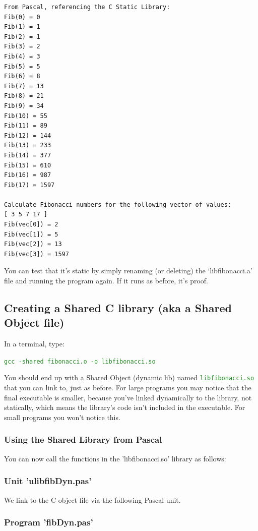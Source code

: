 \documentclass[10pt,a4paper]{article}
\newcommand{\mytext}[1]{\textcolor{ForestGreen}{\texttt{#1}}}
\begin{document}
\lstset{style=myBash}
\begin{lstlisting}
From Pascal, referencing the C Static Library:
Fib(0) = 0
Fib(1) = 1
Fib(2) = 1
Fib(3) = 2
Fib(4) = 3
Fib(5) = 5
Fib(6) = 8
Fib(7) = 13
Fib(8) = 21
Fib(9) = 34
Fib(10) = 55
Fib(11) = 89
Fib(12) = 144
Fib(13) = 233
Fib(14) = 377
Fib(15) = 610
Fib(16) = 987
Fib(17) = 1597

Calculate Fibonacci numbers for the following vector of values:
[ 3 5 7 17 ]
Fib(vec[0]) = 2
Fib(vec[1]) = 5
Fib(vec[2]) = 13
Fib(vec[3]) = 1597
\end{lstlisting}

You can test that it's static by simply renaming (or deleting) the `libfibonacci.a'
file and running the program again. If it runs as before, it's proof.
\clearpage

\subsection{Creating a Shared C library (aka a Shared Object file)}
In a terminal, type:

\mytext{gcc -shared fibonacci.o -o libfibonacci.so}

You should end up with a Shared Object (dynamic lib) named \mytext{libfibonacci.so} 
that you can link to,
just as before. For large programs you may notice that the final executable is smaller,
because you've linked
dynamically to the library, not statically, which means the library's code isn't
included in the executable. For small programs you won't notice this.

\subsubsection{Using the Shared Library from Pascal}\lstset{style=myPascal}
You can now call the functions in the 'libfibonacci.so' library as follows:

\subsubsection*{Unit 'ulibfibDyn.pas'}
We link to the C object file via the following Pascal unit.



\newpage
\subsubsection*{Program 'fibDyn.pas'}

\end{document}
